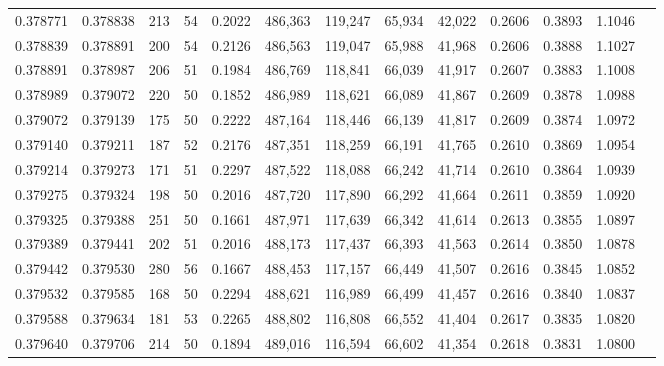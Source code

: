 \begin{tabular}{rrrrrrrrrrrrr}
0.378771 & 0.378838 &   213 &  54 &                                     0.2022 & 486,363 & 119,247 &  65,934 &  42,022 & 0.2606 & 0.3893 & 1.1046 \\
0.378839 & 0.378891 &   200 &  54 &                                     0.2126 & 486,563 & 119,047 &  65,988 &  41,968 & 0.2606 & 0.3888 & 1.1027 \\
0.378891 & 0.378987 &   206 &  51 &                                     0.1984 & 486,769 & 118,841 &  66,039 &  41,917 & 0.2607 & 0.3883 & 1.1008 \\
0.378989 & 0.379072 &   220 &  50 &                                     0.1852 & 486,989 & 118,621 &  66,089 &  41,867 & 0.2609 & 0.3878 & 1.0988 \\
0.379072 & 0.379139 &   175 &  50 &                                     0.2222 & 487,164 & 118,446 &  66,139 &  41,817 & 0.2609 & 0.3874 & 1.0972 \\
0.379140 & 0.379211 &   187 &  52 &                                     0.2176 & 487,351 & 118,259 &  66,191 &  41,765 & 0.2610 & 0.3869 & 1.0954 \\
0.379214 & 0.379273 &   171 &  51 &                                     0.2297 & 487,522 & 118,088 &  66,242 &  41,714 & 0.2610 & 0.3864 & 1.0939 \\
0.379275 & 0.379324 &   198 &  50 &                                     0.2016 & 487,720 & 117,890 &  66,292 &  41,664 & 0.2611 & 0.3859 & 1.0920 \\
0.379325 & 0.379388 &   251 &  50 &                                     0.1661 & 487,971 & 117,639 &  66,342 &  41,614 & 0.2613 & 0.3855 & 1.0897 \\
0.379389 & 0.379441 &   202 &  51 &                                     0.2016 & 488,173 & 117,437 &  66,393 &  41,563 & 0.2614 & 0.3850 & 1.0878 \\
0.379442 & 0.379530 &   280 &  56 &                                     0.1667 & 488,453 & 117,157 &  66,449 &  41,507 & 0.2616 & 0.3845 & 1.0852 \\
0.379532 & 0.379585 &   168 &  50 &                                     0.2294 & 488,621 & 116,989 &  66,499 &  41,457 & 0.2616 & 0.3840 & 1.0837 \\
0.379588 & 0.379634 &   181 &  53 &                                     0.2265 & 488,802 & 116,808 &  66,552 &  41,404 & 0.2617 & 0.3835 & 1.0820 \\
0.379640 & 0.379706 &   214 &  50 &                                     0.1894 & 489,016 & 116,594 &  66,602 &  41,354 & 0.2618 & 0.3831 & 1.0800 \\

\end{tabular}
